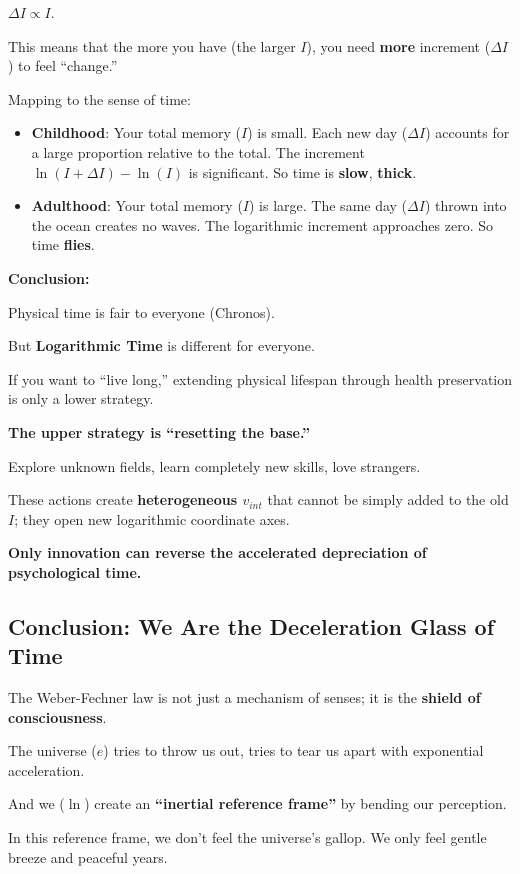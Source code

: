 $\Delta I \propto I$.

This means that the more you have (the larger $I$), you need \textbf{more} increment ($\Delta I$) to feel ``change.''

Mapping to the sense of time:

\begin{itemize}
\item \textbf{Childhood}: Your total memory ($I$) is small. Each new day ($\Delta I$) accounts for a large proportion relative to the total. The increment $\ln(I + \Delta I) - \ln(I)$ is significant. So time is \textbf{slow}, \textbf{thick}.

\item \textbf{Adulthood}: Your total memory ($I$) is large. The same day ($\Delta I$) thrown into the ocean creates no waves. The logarithmic increment approaches zero. So time \textbf{flies}.
\end{itemize}

\textbf{Conclusion:}

Physical time is fair to everyone (Chronos).

But \textbf{Logarithmic Time} is different for everyone.

If you want to ``live long,'' extending physical lifespan through health preservation is only a lower strategy.

\textbf{The upper strategy is ``resetting the base.''}

Explore unknown fields, learn completely new skills, love strangers.

These actions create \textbf{heterogeneous $v_{int}$} that cannot be simply added to the old $I$; they open new logarithmic coordinate axes.

\textbf{Only innovation can reverse the accelerated depreciation of psychological time.}

\subsection{Conclusion: We Are the Deceleration Glass of Time}

The Weber-Fechner law is not just a mechanism of senses; it is the \textbf{shield of consciousness}.

The universe ($e$) tries to throw us out, tries to tear us apart with exponential acceleration.

And we ($\ln$) create an \textbf{``inertial reference frame''} by bending our perception.

In this reference frame, we don't feel the universe's gallop. We only feel gentle breeze and peaceful years.

